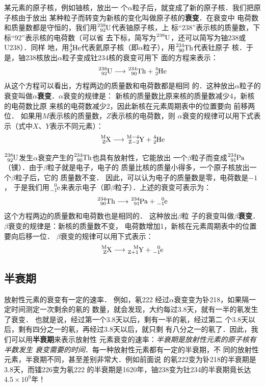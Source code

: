 某元素的原子核，例如铀核，放出一
个$\alpha$粒子后，就变成了新的原子核．我们把原子核由于放出
某种粒子而转变为新核的变化叫做原子核的\textbf{衰变}．在衰变中
电荷数和质量数都是守恒的，我们用$\atom{U}{238}{92}$代表铀原子核，上
标“238”表示核的质量数，下标“92”表示核的电荷数（可以省
去下标，简写为$\atom{U}{238}{}$，还可以简写为铀238或U238）．同样
地，用$\atom{He}{4}{2}$代表氦原子核（即$\alpha$粒子），用$\atom{Th}{234}{90}$代表钍原子
核．于是，铀238核放出$\alpha$粒子变成钍234核的衰变可用下
面的方程来表示：
\[\atom{U}{238}{92}\longrightarrow \atom{Th}{234}{90}+\atom{He}{4}{2}\]
从这个方程可以看出，方程两边的质量数和电荷数都是相同
的．这种放出$\alpha$粒子的衰变叫做\textbf{$\alpha$衰变}．$\alpha$衰变的规律是：
新核的质量数比原来核的质量数减少4，新核的电荷数比原
来核的电荷数减少2，因此新核在元素周期表中的位置要向
前移两位．
如果用$M$表示核的质量数，$Z$表示核的电荷数，则
$\alpha$衰变的规律可以用下式表示（式中$X$、$Y$表示不同元素）：
\[\atom{X}{M}{Z}\longrightarrow \atom{Y}{M-4}{Z-2}+\atom{He}{4}{2}   \]

$\atom{U}{238}{92}$发生$\alpha$衰变产生的$\atom{Th}{234}{90}$也具有放射性，它能放出
一个$\beta$粒子而变成$\atom{Pa}{234}{91}$（镤）．由于$\beta$粒子就是电子，电子的
质量比核的质量小得多，一个原子核放出一个$\beta$粒子后，它的
质量数不变．
因此，可以认为电子的质量数是零，电荷数是$-1$，
于是我们用$\atom{e}{0}{-1}$来表示电子（即$\beta$粒子）．上述的衰变可表示为：
\[\atom{Th}{234}{90}\longrightarrow \atom{Pa}{234}{91}+ \atom{e}{0}{-1}\]
这个方程两边的质量数和电荷数也是相同的．
这种放出$\beta$粒
子的衰变叫做\textbf{$\beta$衰变}．
$\beta$衰变的规律是：新核的质量数不变，
电荷数增加1，新核在元素周期表中的位置要向后移一位．
$\beta$衰变的规律可以用下式表示：
\[\atom{X}{M}{Z}\longrightarrow \atom{Y}{M}{Z+1}+ \atom{e}{0}{-1}\]



\subsection{半衰期}
放射性元素的衰变有一定的速率．
例如，氡222
经过$\alpha$衰变变为钋218，如果隔一定时间测定一次剩余的氡的
数量，就会发现，大约每过3.8天，就有一半的氡发生了衰变．
也就是说，经过第一个3.8天以后，剩有一半的氡，经过第二
个3.8天以后，剩有四分之一的氡，再经过3.8天以后，就只剩
有八分之一的氡了．因此，我们可以用\textbf{半衰期}来表示放射性
元素衰变的速率：\textit{半衰期是放射性元素的原子核有半数发生
衰变需要的时间}．每一种放射性元素都有一定的半衰期，不
同的放射性元素，半衰期不同，甚至差别非常大．例如前面说
的氡222变为钋218的半衰期是3.8天，而镭226变为氡222
的半衰期是1620年，铀238变为钍234的半衰期竟长达$4.5
\times10^9$年！

